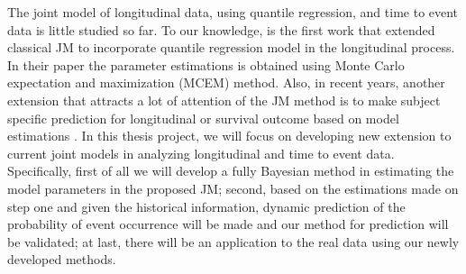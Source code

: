 \documentclass{article}
\begin{document}
The joint model of longitudinal data, using quantile regression, and time to event data is little studied so far. To our knowledge, \cite{Alessio2014qrjm} is the first work that extended classical JM to incorporate quantile regression model in the longitudinal process. In their paper the parameter estimations is obtained using Monte Carlo expectation and maximization (MCEM) method.  Also, in recent years, another extension that attracts a lot of attention of the JM method is to make subject specific prediction for longitudinal or survival outcome based on model estimations \citep{rizopoulos2011dynamic,taylor2013real}. In this thesis project, we will focus on developing new extension to current joint models in analyzing longitudinal and time to event data. Specifically, first of all we will develop a fully Bayesian method in estimating the model parameters in the proposed JM; second, based on the estimations made on step one and given the historical information, dynamic prediction of the probability of event occurrence will be made and our method for prediction will be validated; at last, there will be an application to the real data  using our newly developed methods. \par







\par













\end{document}
